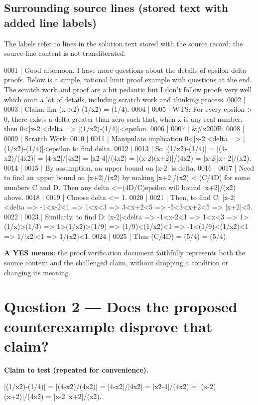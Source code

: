 \documentclass[11pt]{article}
\begin{document}
\subsection*{Surrounding source lines (stored text with added line labels)}
The labels refer to lines in the solution text stored with the source record; the source-line content is not transliterated.
\begin{Vsrc}
0001 | Good afternoon. I have more questions about the details of epsilon-delta proofs. Below is a simple, rational limit proof example with questions at the end. The scratch work and proof are a bit pedantic but I don't follow proofs very well which omit a lot of details, including scratch work and thinking process.
0002 | 
0003 | Claim: lim (x->2) (1/x\^2) = (1/4).
0004 | 
0005 | WTS: For every epsilon > 0, there exists a delta greater than zero such that, when x is any real number, then 0<|x-2|<delta => |(1/x\^2)-(1/4)|<epsilon.
0006 | 
0007 | &#x200B;
0008 | 
0009 | Scratch Work:
0010 | 
0011 | \* Manipulate implication 0<|x-2|<delta => |(1/x\^2)-(1/4)|<epsilon to find delta.
0012 | 
0013 | \* So |(1/x\^2)-(1/4)| = |(4-x\^2)/(4x\^2)| = |4-x\^2|/|4x\^2| = |x\^2-4|/(4x\^2) = |(x-2)(x+2)|/(4x\^2) = |x-2||x+2|/(x\^2).
0014 | 
0015 | \* By assumption, an upper bound on |x-2| is delta.
0016 | 
0017 | \* Need to find an upper bound on |x+2|/(x\^2) by making |x+2|/(x\^2) < (C/4\*D) for some numbers C and D. Then any delta <=(4\*D/C)\*epsilon will bound |x+2|/(x\^2) above.
0018 | 
0019 | \* Choose delta <= 1.
0020 | 
0021 | \* Then, to find C: |x-2|<delta => -1<x-2<1 => 1<x<3 => 3<x+2<5 => -5<3<x+2<5 => |x+2|<5.
0022 | 
0023 | \* Similarly, to find D: |x-2|<delta => -1<x-2<1 => 1<x<3 => 1>(1/x)>(1/3) => 1>(1/x\^2)>(1/9) => (1/9)<(1/x\^2)<1 => -1<(1/9)<(1/x\^2)<1 => 1/|x\^2|<1 => 1/(x\^2)<1.
0024 | 
0025 | \* Thus (C/4\*D) = (5/4) = (5/4).
\end{Vsrc}
\textbf{A YES means:} the proof verification document faithfully represents both the source context and the challenged claim, without dropping a condition or changing its meaning.
\section*{Question 2 --- Does the proposed counterexample disprove that claim?}
\textbf{Claim to test (repeated for convenience).}
\begin{Vsrc}
|(1/x\^2)-(1/4)| = |(4-x\^2)/(4x\^2)| = |4-x\^2|/|4x\^2| = |x\^2-4|/(4x\^2) = |(x-2)(x+2)|/(4x\^2) = |x-2||x+2|/(x\^2).
\end{Vsrc}
\end{document}
